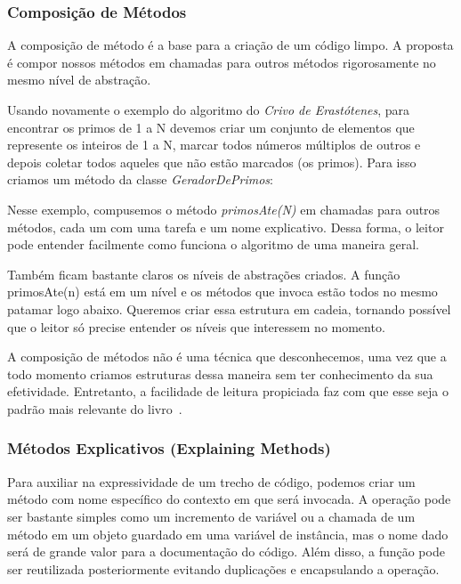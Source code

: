 \subsubsection{Composição de Métodos}
\label{metodos:composicao}
A composição de método é a base para a criação de um código limpo. A proposta é compor nossos métodos em chamadas para outros métodos rigorosamente no mesmo nível de abstração.
	
Usando novamente o exemplo do algoritmo do \textit{Crivo de Erastótenes}, para encontrar os primos de 1 a N devemos criar um conjunto de elementos que represente os inteiros de 1 a N, marcar todos números múltiplos de outros e depois coletar todos aqueles que não estão marcados (os primos). Para isso criamos um método da classe \textit{GeradorDePrimos}:



Nesse exemplo, compusemos o método \textit{primosAte(N)} em chamadas para outros métodos, cada um com uma tarefa e um nome explicativo. Dessa forma, o leitor pode entender facilmente como funciona o algoritmo de uma maneira geral. 
	
Também ficam bastante claros os níveis de abstrações criados. A função primosAte(n) está em um nível e os métodos que invoca estão todos no mesmo patamar logo abaixo. Queremos criar essa estrutura em cadeia, tornando possível que o leitor só precise entender os níveis que interessem no momento.
	
A composição de métodos não é uma técnica que desconhecemos, uma vez que a todo momento criamos estruturas dessa maneira sem ter conhecimento da sua efetividade. Entretanto, a facilidade de leitura propiciada faz com que esse seja o padrão mais relevante do livro~\citep{Beck2007, InfoQ2010}. 	

\subsubsection{Métodos Explicativos (Explaining Methods)}
\label{metodos:explicativos}
Para auxiliar na expressividade de um trecho de código, podemos criar um método com nome específico do contexto em que será invocada. A operação pode ser bastante simples como um incremento de variável ou a chamada de um método em um objeto guardado em uma variável de instância, mas o nome dado será de grande valor para a documentação do código. Além disso, a função pode ser reutilizada posteriormente evitando duplicações e encapsulando a operação.
	
